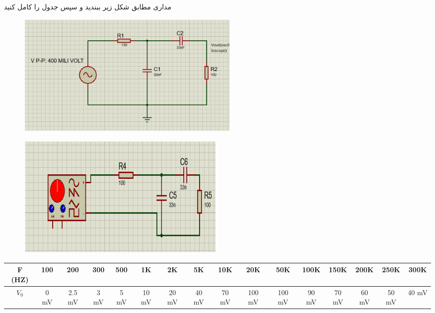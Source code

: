 \documentclass[12pt]{article}
\begin{document}
\clearpage
\subsection{}
مداری مطابق شکل زیر ببندید و سپس جدول را کامل کنید

\begin{figure}[H]
\begin{center}
\includegraphics[width=\textwidth, height=6cm]{./images/6.6}
\end{center}
\end{figure}

\begin{figure}[H]
\begin{center}
\includegraphics[width=\textwidth, height=6cm]{./images/6.6.a}
\end{center}
\end{figure}

\begin{latin}
\begin{table}[H]
\begin{adjustbox}{width=\textwidth}
\begin{tabular}{|c|c|c|c|c|c|c|c|c|c|c|c|c|c|c|c|}
\hline
F (HZ) & 
100 & 
200 & 
300 & 
500 & 
1K & 
2K & 
5K & 
10K & 
20K & 
50K & 
100K & 
150K & 
200K & 
250K & 
300K \\
\hline
\hline
$V_0$ & 0 mV & 2.5 mV & 3 mV &  5 mV & 10 mV & 20 mV & 
40 mV & 70 mV & 
100 mV & 100 mV & 90 mV & 
70 mV & 60 mV & 50 mV & 40 mV \\
\hline
\end{tabular}
\end{adjustbox}
\end{table}
\end{latin}
\end{document}
